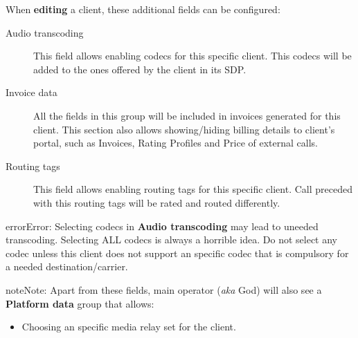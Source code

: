 \documentclass[letterpaper,10pt,english]{sphinxmanual}
\begin{document}
When \textbf{editing} a client, these additional fields can be configured:
\begin{description}
\item[{Audio transcoding}] \leavevmode{}\label{administration_portal/brand/clients/wholesale:term-audio-transcoding}
This field allows enabling codecs for this specific client. This codecs will be added to
the ones offered by the client in its SDP.

\item[{Invoice data}] \leavevmode{}\label{administration_portal/brand/clients/wholesale:term-invoice-data}
All the fields in this group will be included in invoices generated for this client. This section also allows
showing/hiding billing details to client's portal, such as Invoices, Rating Profiles and Price of external calls.

\item[{Routing tags}] \leavevmode{}\label{administration_portal/brand/clients/wholesale:term-routing-tags}
This field allows enabling routing tags for this specific client. Call preceded with this
routing tags will be rated and routed differently.

\end{description}

\begin{notice}{error}{Error:}
Selecting codecs in \textbf{Audio transcoding} may lead to uneeded transcoding. Selecting ALL codecs is
always a horrible idea. Do not select any codec unless this client does not support an specific codec
that is compulsory for a needed destination/carrier.
\end{notice}

\begin{notice}{note}{Note:}
Apart from these fields, main operator (\emph{aka} God) will also see a \textbf{Platform data} group that allows:
\begin{itemize}
\item {} 
Choosing an specific media relay set for the client.

\end{itemize}
\end{notice}
\end{document}

